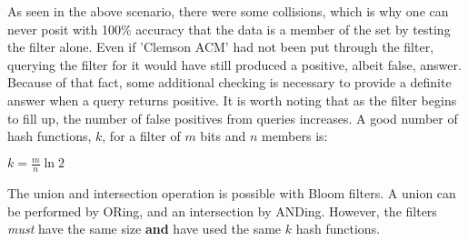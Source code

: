 As seen in the above scenario, there were some collisions, which is why one can never posit with 100\% accuracy that the data is a member of the set by testing the filter alone.
Even if 'Clemson ACM' had not been put through the filter, querying the filter for it would have still produced a positive, albeit false, answer.
Because of that fact, some additional checking is necessary to provide a definite answer when a query returns positive.
It is worth noting that as the filter begins to fill up, the number of false positives from queries increases.
A good number of hash functions, $k$, for a filter of $m$ bits and $n$ members is:

\Large
\begin{center}
	$k = \frac{m}{n}\ln 2$
\end{center}
\normalsize

The union and intersection operation is possible with Bloom filters. A union can be performed by ORing, and an intersection by ANDing.
However, the filters \textit{must} have the same size \textbf{and} have used the same $k$ hash functions.
